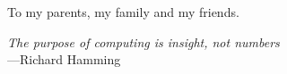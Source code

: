 %
\begin{frontmatter}

%
%
\makefrontmatter 

%
%   
%
%
%
%
\begin{dedication} 
	To my parents, my family and my friends.
\end{dedication}

%   
%



%
%

\begin{epigraph} 
  \emph{The purpose of computing is insight, not numbers}\\
  ---Richard Hamming

    \vspace{2.3in}


\end{epigraph}
\end{frontmatter}
